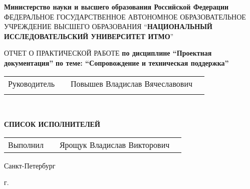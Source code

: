 \begin{titlepage}
    \begin{center}
        \textbf{Министерство науки и высшего образования Российской Федерации}
        \linebreak
        \textnormal{ФЕДЕРАЛЬНОЕ ГОСУДАРСТВЕННОЕ АВТОНОМНОЕ ОБРАЗОВАТЕЛЬНОЕ УЧРЕЖДЕНИЕ ВЫСШЕГО ОБРАЗОВАНИЯ}
        \enquote{\textbf{НАЦИОНАЛЬНЫЙ ИССЛЕДОВАТЕЛЬСКИЙ УНИВЕРСИТЕТ ИТМО}}
        \linebreak
        \vspace{35mm}

        \textnormal{ОТЧЕТ О ПРАКТИЧЕСКОЙ РАБОТЕ}
        \linebreak
        \textbf{по дисциплине \enquote{Проектная документация}}
        \linebreak
        \textbf{по теме: \enquote{Сопровождение и техническая поддержка}}
        \linebreak
    \end{center}

        \vspace{35mm}
    \normalsize{
        \begin{tabular}{cccc}
            Руководитель & \underline{\hspace{3cm}} & Повышев Владислав Вячеславович \\\\
        \end{tabular}
    }\\
    \begin{center}
        \textbf{СПИСОК ИСПОЛНИТЕЛЕЙ}
    \end{center}

    \normalsize{
        \begin{tabular}{cccc}
            Выполнил & \underline{\hspace{3cm}} & Ярощук Владислав Викторович
        \end{tabular}
    }

    \begin{center}
        \vfill
        {Санкт-Петербург}
        \par{\the\year{} г.}
    \end{center}
\end{titlepage}
\restoregeometry
\addtocounter{page}{1}
